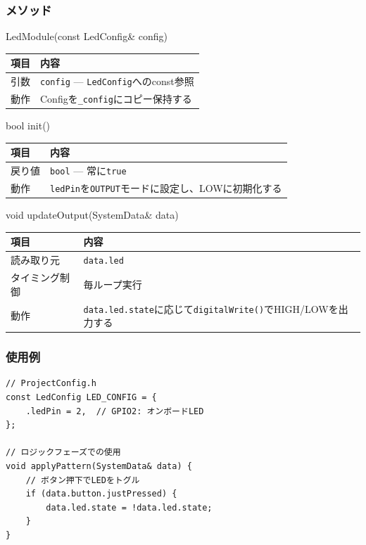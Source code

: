 \subsubsection{メソッド}

\begin{funcblock}{LedModule(const LedConfig\& config)}
\begin{tabularx}{\textwidth}{l X}
\toprule
\textbf{項目} & \textbf{内容} \\
\midrule
引数   & \texttt{config} --- \texttt{LedConfig}へのconst参照 \\
動作   & Configを\texttt{\_config}にコピー保持する \\
\bottomrule
\end{tabularx}
\end{funcblock}

\begin{funcblock}{bool init()}
\begin{tabularx}{\textwidth}{l X}
\toprule
\textbf{項目} & \textbf{内容} \\
\midrule
戻り値   & \texttt{bool} --- 常に\texttt{true} \\
動作     & \texttt{ledPin}を\texttt{OUTPUT}モードに設定し、LOWに初期化する \\
\bottomrule
\end{tabularx}
\end{funcblock}

\begin{funcblock}{void updateOutput(SystemData\& data)}
\begin{tabularx}{\textwidth}{l X}
\toprule
\textbf{項目} & \textbf{内容} \\
\midrule
読み取り元     & \texttt{data.led} \\
タイミング制御 & 毎ループ実行 \\
動作           & \texttt{data.led.state}に応じて\texttt{digitalWrite()}でHIGH/LOWを出力する \\
\bottomrule
\end{tabularx}
\end{funcblock}

\subsubsection{使用例}

\begin{lstlisting}[style=cppstyle, caption={LedModuleの使用例}]
// ProjectConfig.h
const LedConfig LED_CONFIG = {
    .ledPin = 2,  // GPIO2: オンボードLED
};

// ロジックフェーズでの使用
void applyPattern(SystemData& data) {
    // ボタン押下でLEDをトグル
    if (data.button.justPressed) {
        data.led.state = !data.led.state;
    }
}
\end{lstlisting}
